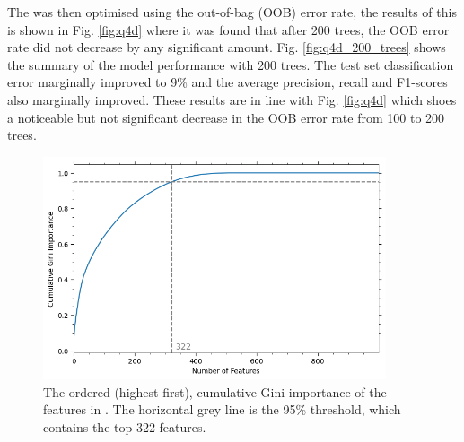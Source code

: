     The  was then optimised using the out-of-bag (OOB) error rate, the results of this
    is shown in Fig. \eqref{fig:q4d} where it was found that after 200 trees, the OOB error rate did not decrease by
    any significant amount.
    Fig. \eqref{fig:q4d_200_trees} shows the summary of the model performance with 200 trees.
    The test set classification error marginally improved to 9\% and the average precision, recall and F1-scores also
    marginally improved.
    These results are in line with Fig. \eqref{fig:q4d} which shoes a noticeable but not significant decrease in the
    OOB error rate from 100 to 200 trees.

    \begin{figure}[htb]
    \centering
    \includegraphics[width=0.9\textwidth]{./figures/q4e_gini_importance}
    \caption{The ordered (highest first), cumulative Gini importance of the features in
        . The horizontal grey line is the 95\% threshold, which contains the top
        322 features.}
        \label{fig:q4e_gini_importance}
    \end{figure}

